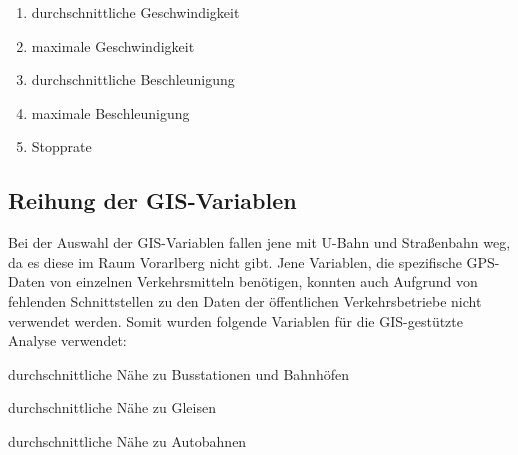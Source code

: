 \begin{enumerate}
\item durchschnittliche Geschwindigkeit
\item maximale Geschwindigkeit
\item durchschnittliche Beschleunigung
\item maximale Beschleunigung
\item Stopprate
\end{enumerate}


\subsection{Reihung der GIS-Variablen}
Bei der Auswahl der GIS-Variablen fallen jene mit U-Bahn und Straßenbahn weg, da es diese im Raum Vorarlberg nicht gibt. Jene Variablen, die spezifische GPS-Daten von einzelnen Verkehrsmitteln benötigen, konnten auch Aufgrund von fehlenden Schnittstellen zu den Daten der öffentlichen Verkehrsbetriebe nicht verwendet werden. Somit wurden folgende Variablen für die GIS-gestützte Analyse verwendet:

\begin{pitemize}
\item durchschnittliche Nähe zu Busstationen und Bahnhöfen
\item durchschnittliche Nähe zu Gleisen	
\item durchschnittliche Nähe zu Autobahnen
\end{pitemize}
\clearpage

